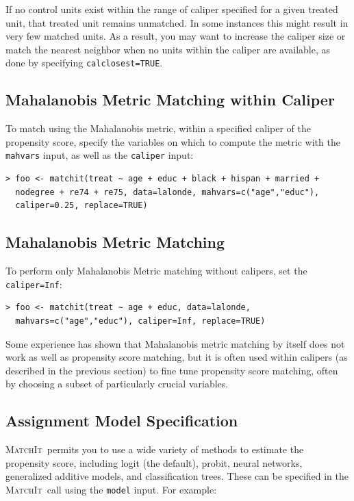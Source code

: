 \documentclass[oneside,letterpaper,titlepage]{article}
\newcommand{\MatchIt}{\textsc{MatchIt}}
\begin{document}
If no control units exist within the range of caliper specified for a
given treated unit, that treated unit remains unmatched.  In some
instances this might result in very few matched units.  As a result,
you may want to increase the caliper size or match the nearest
neighbor when no units within the caliper are available, as done by
specifying \texttt{calclosest=TRUE}.

\subsection{Mahalanobis Metric Matching within Caliper}
\label{mahal}
To match using the Mahalanobis metric, within a specified caliper of
the propensity score, specify the variables on which to compute the
metric with the \texttt{mahvars} input, as well as the
\texttt{caliper} input:

\begin{verbatim}
> foo <- matchit(treat ~ age + educ + black + hispan + married +
  nodegree + re74 + re75, data=lalonde, mahvars=c("age","educ"),
  caliper=0.25, replace=TRUE)
\end{verbatim}

\subsection{Mahalanobis Metric Matching}

To perform only Mahalanobis Metric matching without calipers, set the
\texttt{caliper=Inf}:

\begin{verbatim}
> foo <- matchit(treat ~ age + educ, data=lalonde,
  mahvars=c("age","educ"), caliper=Inf, replace=TRUE)
\end{verbatim}
Some experience has shown that Mahalanobis metric matching by itself
does not work as well as propensity score matching, but it is often
used within calipers (as described in the previous section) to fine
tune propensity score matching, often by choosing a subset of
particularly crucial variables.

\subsection{Assignment Model Specification}

\MatchIt\ permits you to use a wide variety of methods to estimate the
propensity score, including logit (the default), probit, neural
networks, generalized additive models, and classification trees.
These can be specified in the \MatchIt\ call using the \texttt{model}
input.  For example:
\end{document}
